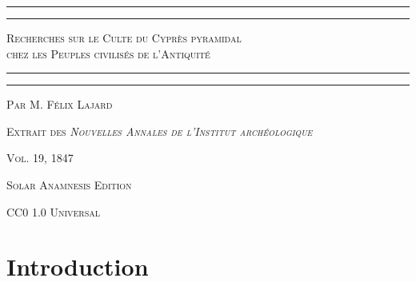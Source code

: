 \documentclass[a4paper, 11pt, oneside, polutonikogreek, french]{article}
\begin{document}
\begin{titlepage} %
	\centering %

	
	\rule{\textwidth}{1.6pt}\vspace*{-\baselineskip}\vspace*{2pt} %
	\rule{\textwidth}{0.4pt} %
	
	{\scshape\LARGE Recherches sur le Culte du Cyprès pyramidal\\ chez les Peuples civilisés de l'Antiquité}
	
	\rule{\textwidth}{0.4pt}\vspace*{-\baselineskip}\vspace{3.2pt} %
	\rule{\textwidth}{1.6pt} %

	
	{\scshape Par M. Félix Lajard} %
	
    
	
	
    \vspace*{\fill}

	\vspace{1\baselineskip}

	{\small\scshape Extrait des \emph{Nouvelles Annales de l'Institut archéologique}}
	
	{\small\scshape{Vol. 19, 1847}}
	
	\vspace{0.5\baselineskip} %

    \scshape Solar Anamnesis Edition  %
	
	{\scshape\small CC0 1.0 Universal} %
\end{titlepage}
\setlength{\parskip}{1mm plus1mm minus1mm}
\setcounter{tocdepth}{3}
\setcounter{secnumdepth}{3}
\tableofcontents
\clearpage
\section*{Introduction}
\end{document}
